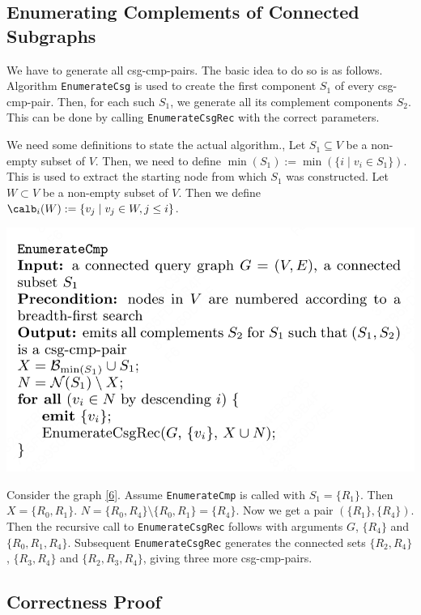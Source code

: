 \documentclass[11pt]{article}
\begin{document}
\subsection{Enumerating Complements of Connected Subgraphs}
\label{sec:org227b54a}
We have to generate all csg-cmp-pairs. The basic idea to do so is as follows. Algorithm \texttt{EnumerateCsg}
is used to create the first component \(S_1\) of every csg-cmp-pair. Then, for each such \(S_1\), we
generate all its complement components \(S_2\). This can be done by calling \texttt{EnumerateCsgRec} with the
correct parameters.

We need some definitions to state the actual algorithm., Let \(S_1\subseteq V\) be a non-empty subset
of \(V\). Then, we need to define \(\min(S_1):=\min(\{i\mid v_i\in S_1\})\). This is used to extract
the starting node from which \(S_1\) was constructed. Let \(W\subset V\) be a non-empty subset of
\(V\). Then we define \(\calb_i(W):=\{v_j\mid v_j\in W,j\le i\}\).

\begin{center}
\includegraphics[width=.8\textwidth]{../../images/papers/104.png}
\end{center}

Consider the graph \ref{6}. Assume \texttt{EnumerateCmp} is called with \(S_1=\{R_1\}\). Then \(X=\{R_0,R_1\}\).
\(N=\{R_0,R_4\}\setminus\{R_0,R_1\}=\{R_4\}\). Now we get a pair \((\{R_1\},\{R_4\})\).
Then the recursive call to \texttt{EnumerateCsgRec} follows with arguments \(G\), \(\{R_4\}\) and
\(\{R_0,R_1,R_4\}\). Subsequent \texttt{EnumerateCsgRec} generates the connected sets \(\{R_2,R_4\}\),
\(\{R_3,R_4\}\) and \(\{R_2,R_3,R_4\}\), giving three more csg-cmp-pairs.
\subsection{Correctness Proof}
\label{sec:org6580ae3}
\end{document}
